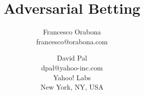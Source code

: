 \documentclass{article} %
\begin{document}
\nobibliography*

\title{Adversarial Betting}
\author{Francesco Orabona \\ francesco@orabona.com
\and David Pal \\ dpal@yahoo-inc.com\\
Yahoo! Labs\\New York, NY, USA}


\maketitle



\begin{abstract}%

\end{abstract}










\end{document}
